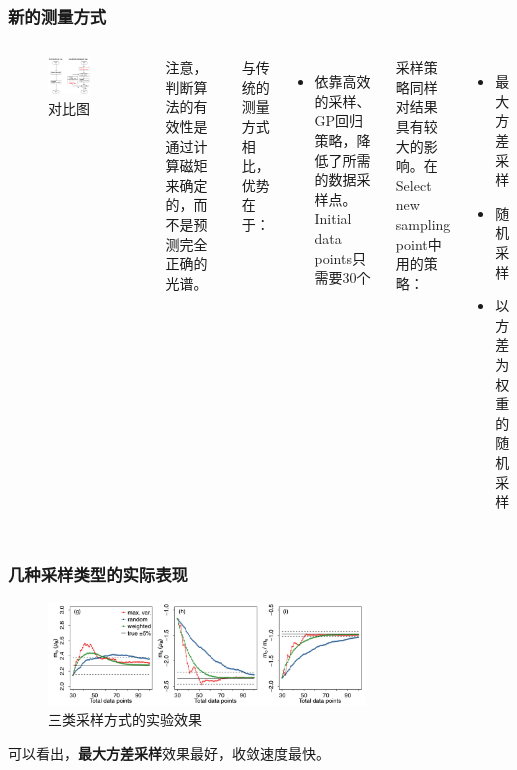 \documentclass{beamer}
\begin{document}
\begin{frame}
\frametitle{新的测量方式}
\begin{columns}
\begin{figure}
\centering
\includegraphics[width=0.75\textwidth]{Materials/Spectroscopy2.png}
\caption{对比图}
\end{figure}
注意，判断算法的有效性是通过计算磁矩来确定的，而不是预测完全正确的光谱。

与传统的测量方式相比，优势在于：
\begin{itemize}
\item 依靠高效的采样、GP回归策略，降低了所需的数据采样点。Initial data points只需要30个
\end{itemize}

采样策略同样对结果具有较大的影响。在Select new sampling point中用的策略：
\begin{itemize}
\item 最大方差采样
\item 随机采样
\item 以方差为权重的随机采样
\end{itemize}
\end{columns}
\end{frame}

\begin{frame}
\frametitle{几种采样类型的实际表现}
\begin{figure}
\centering
\includegraphics[width=0.75\textwidth]{Materials/Samples1.png}
\caption{三类采样方式的实验效果}
\end{figure}
可以看出，\textbf{最大方差采样}效果最好，收敛速度最快。
\end{frame}
\end{document}
